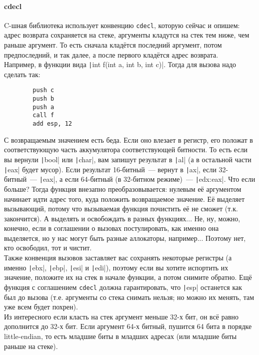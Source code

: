 \documentclass{article}
\begin{document}
    \paragraph{cdecl}
    C-шная библиотека использует конвенцию \Verb|cdecl|, которую сейчас и опишем: адрес возврата сохраняется на стеке, аргументы кладутся на стек тем ниже, чем раньше аргумент. То есть сначала кладётся последний аргумент, потом предпоследний, и так далее, а после первого кладётся адрес возврата.\\
    Например, в функции вида \texttt|int f(int a, int b, int c)|. Тогда для вызова надо сделать так:
    \begin{verbatim}
        push c
        push b
        push a
        call f
        add esp, 12
    \end{verbatim}
    С возвращаемым значением есть беда. Если оно влезает в регистр, его положат в соответствующую часть аккумулятора соответствующей битности. То есть если вы вернули \texttt|bool| или \texttt|char|, вам запишут результат в \texttt|al| (а в остальной части \texttt|eax| будет мусор). Если результат 16-битный~--- вернут в \texttt|ax|, если 32-битный~--- \texttt|eax|, а если 64-битный (в 32-битном режиме)~--- \texttt|edx:eax|. Что если больше? Тогда функция внезапно преобразовывается: нулевым её аргументом начинает идти адрес того, куда положить возвращаемое значение. Её выделяет вызывающий, потому что вызываемая функция почистить её не сможет (т.к. закончится). А выделять и освобождать в разных функциях... Не, ну, можно, конечно, если в соглашении о вызовах постулировать, как именно она выделяется, но у нас могут быть разные аллокаторы, например... Поэтому нет, кто освободил, тот и чистит.\\
    Также конвенция вызовов заставляет вас сохранять некоторые регистры (а именно \texttt|ebx|, \texttt|ebp|, \texttt|esi| и \texttt|edi|), поэтому если вы хотите испортить их значение, положите их на стек в начале функции, а потом снимите обратно. Ещё функция с соглашением \Verb|cdecl| должна гарантировать, что \texttt|esp| останется как был до вызова (т.е. аргументы со стека снимать нельзя; но можно их менять, там уже всем будет похрен).\\
    Из интересного если класть на стек аргумент меньше 32-х бит, он всё равно дополнится до 32-х бит. Если аргумент 64-х битный, пушится 64 бита в порядке little-endian, то есть младшие биты в младших адресах (или младшие биты раньше на стеке).
\end{document}
